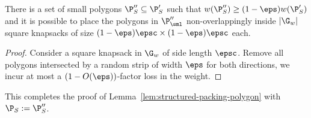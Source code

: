\begin{lem} \label{lem:grid-resource-augmentation}There is a set
	of small polygons $\P''_{S}\subseteq\P'_{S}$ such that $w(\P''_{S})\ge(1-\eps)w(\P'_{S})$
	and it is possible to place the polygons in $\P''_{\sml}$ non-overlappingly
	inside $|\G_{w}|$ square knapsacks of size $(1-\eps)\epsc \times(1-\eps)\epsc$
	each. \end{lem}
\begin{proof}
	Consider a square knapsack in $\G_{w}$ of side length $\epsc$.
	Remove  all polygons intersected by a random strip of width $\eps$ for both directions, we incur at most a $(1-O(\eps))$-factor loss in the weight.
\end{proof}
This completes the proof of Lemma~\ref{lem:structured-packing-polygon} with $\P_{S}:= \P''_{S}$.

